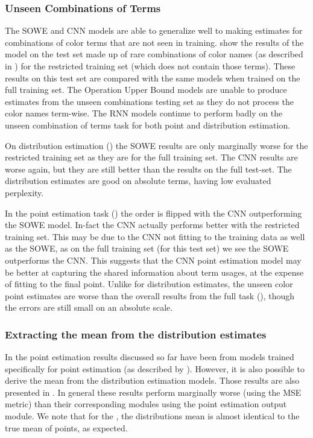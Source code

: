\documentclass[11pt,a4paper]{article}
\begin{document}
\subsubsection{Unseen Combinations of Terms}
The SOWE and CNN models are able to generalize well to making estimates for combinations of color terms that are not seen in training.
 show the results of the model on the test set made up of rare combinations of color names (as described in ) for the restricted training set (which does not contain those terms).
These results on this test set are compared with the same models when trained on the full training set.
The Operation Upper Bound models are unable to produce estimates from the unseen combinations testing set as they do not process the color names term-wise.
The RNN models continue to perform badly on the unseen combination of terms task for both point and distribution estimation.

On distribution estimation () the SOWE results are only marginally worse for the restricted training set as they are for the full training set.
The CNN results are worse again, but they are still better than the results on the full test-set.
The distribution estimates are good on absolute terms, having low evaluated perplexity.

In the point estimation task () the order is flipped with the CNN outperforming the SOWE model.
In-fact the CNN actually performs better with the restricted training set.
This may be due to the CNN not fitting to the training data as well as the SOWE,
as on the full training set (for this test set) we see the SOWE outperforms the CNN.
This suggests that the CNN point estimation model may be better at capturing the shared information about term usages, at the expense of fitting to the final point.
Unlike for distribution estimates, the unseen color point estimates are worse than the overall results from the full task (), though the errors are still small on an absolute scale.



\subsubsection{Extracting the mean from the distribution estimates}

In the point estimation results discussed so far have been from models trained specifically for point estimation (as described by ).
However, it is also possible to derive the mean from the distribution estimation models.
Those results are also presented in .
In general these results perform marginally worse (using the MSE metric) than their corresponding modules using the point estimation output module.
We note that for the \empmodel{}, the distributions mean is almost identical to the true mean of points, as expected.
\end{document}

